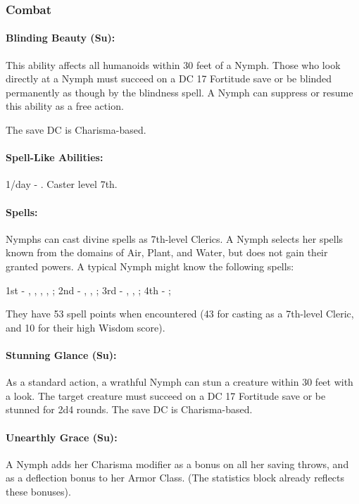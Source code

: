 \subsubsection{Combat}
\paragraph{Blinding Beauty (Su):}
This ability affects all humanoids within 30 feet of a Nymph. 
Those who look directly at a Nymph must succeed on a DC 17 Fortitude save or be blinded permanently as though by the blindness spell. 
A Nymph can suppress or resume this ability as a free action.

The save DC is Charisma-based.

\paragraph{Spell-Like Abilities:}
1/day - . Caster level 7th.

\paragraph{Spells:}
Nymphs can cast divine spells as 7th-level Clerics.
A Nymph selects her spells known from the domains of Air, Plant, and Water, but does not gain their granted powers. A typical Nymph might know the following spells:

1st - , , , , ;
2nd - , , ;
3rd - , , ;
4th - ;

They have 53 spell points when encountered (43 for casting as a 7th-level Cleric, and 10 for their high Wisdom score).

\paragraph{Stunning Glance (Su):}
As a standard action, a wrathful Nymph can stun a creature within 30 feet with a look. The target creature must succeed on a DC 17 Fortitude save or be stunned for 2d4 rounds. The save DC is Charisma-based.

\paragraph{Unearthly Grace (Su):}
A Nymph adds her Charisma modifier as a bonus on all her saving throws, and as a deflection bonus to her Armor Class. (The statistics block already reflects these bonuses).

